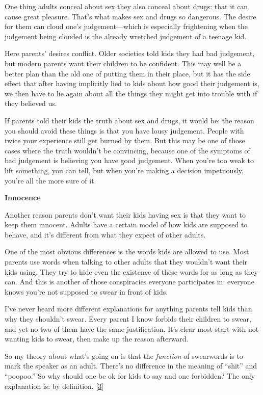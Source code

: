 One thing adults conceal about sex they also conceal about drugs: that
it can cause great pleasure. That's what makes sex and drugs so
dangerous. The desire for them can cloud one's judgement---which is
especially frightening when the judgement being clouded is the already
wretched judgement of a teenage kid.

Here parents' desires conflict. Older societies told kids they had bad
judgement, but modern parents want their children to be confident. This
may well be a better plan than the old one of putting them in their
place, but it has the side effect that after having implicitly lied to
kids about how good their judgement is, we then have to lie again about
all the things they might get into trouble with if they believed us.

If parents told their kids the truth about sex and drugs, it would be:
the reason you should avoid these things is that you have lousy
judgement. People with twice your experience still get burned by them.
But this may be one of those cases where the truth wouldn't be
convincing, because one of the symptoms of bad judgement is believing
you have good judgement. When you're too weak to lift something, you can
tell, but when you're making a decision impetuously, you're all the more
sure of it.

\textbf{Innocence}

Another reason parents don't want their kids having sex is that they
want to keep them innocent. Adults have a certain model of how kids are
supposed to behave, and it's different from what they expect of other
adults.

One of the most obvious differences is the words kids are allowed to
use. Most parents use words when talking to other adults that they
wouldn't want their kids using. They try to hide even the existence of
these words for as long as they can. And this is another of those
conspiracies everyone participates in: everyone knows you're not
supposed to swear in front of kids.

I've never heard more different explanations for anything parents tell
kids than why they shouldn't swear. Every parent I know forbids their
children to swear, and yet no two of them have the same justification.
It's clear most start with not wanting kids to swear, then make up the
reason afterward.

So my theory about what's going on is that the \emph{function} of
swearwords is to mark the speaker as an adult. There's no difference in
the meaning of ``shit'' and ``poopoo.'' So why should one be ok for kids
to say and one forbidden? The only explanation is: by definition.
{[}\hyperref[f3n]{3}{]}

